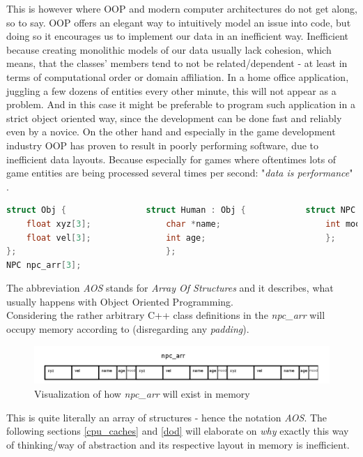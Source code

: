  This is however where OOP and modern computer architectures do not get along, so to say. OOP offers an elegant way to intuitively model an issue into code, but doing so it encourages us to implement our data in an inefficient way. Inefficient because creating monolithic models of our data usually lack cohesion, which means, that the classes' members tend to not be related/dependent  - at least in terms of computational order or domain affiliation. In a home office application, juggling a few dozens of entities every other minute, this will not appear as a problem. And in this case it might be preferable to program such application in a strict object oriented way, since the development can be done fast and reliably even by a novice. On the other hand and especially in the game development industry OOP has proven to result in poorly performing software, due to inefficient data layouts. Because especially for games where oftentimes lots of game entities are being processed several times per second: "\textit{data is performance}" .
 \begin{lstlisting}[language=C++,numbers=none,name={Example of some hierarchical POD class definitions},label={pods}]
struct Obj {				struct Human : Obj {			struct NPC : Human {
	float xyz[3];				char *name;						int mood;
	float vel[3];				int age;						};
};								};
NPC npc_arr[3];
 \end{lstlisting}
The abbreviation \textit{AOS} stands for \textit{Array Of Structures} and it describes, what usually happens with Object Oriented Programming.\\
Considering the rather arbitrary C++ class definitions in  the \textit{npc\_arr} will occupy memory according to  (disregarding any \textit{padding}).
\begin{figure}[!htbp]
	\centering
	\includegraphics[width=1.0\linewidth]{PICs/npcs_in_memory}
	\caption{Visualization of how \textit{npc\_arr} will exist in memory}\label{npcs_in_memory}
\end{figure}
This is quite literally an array of structures - hence the notation \textit{AOS}. The following sections \ref{cpu_caches} and \ref{dod} will elaborate on \textit{why} exactly this way of thinking/way of abstraction and its respective layout in memory is inefficient.

